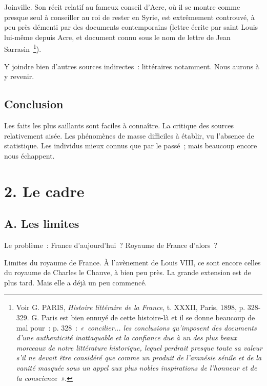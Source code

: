 \documentclass[french,twoside]{book} %
\newcommand\chapteropen{} %
\newcommand\chaptercont{} %
\newcommand\chapterclose{} %
\begin{document}
Joinville. Son récit relatif au fameux conseil d’Acre, où il se montre comme presque seul à conseiller au roi de rester en Syrie, est extrêmement controuvé, à peu près démenti par des documents contemporains (lettre écrite par saint Louis lui-même depuis Acre, et document connu sous le nom de lettre de Jean Sarrasin \footnote{ Voir G. PARIS, {\itshape Histoire littéraire de la France}, t. XXXII, Paris, 1898, p. 328-329. G. Paris est bien ennuyé de cette histoire-là et il se donne beaucoup de mal pour : p. 328 : \emph{« concilier... les conclusions qu’imposent des documents d’une authenticité inattaquable et la confiance due à un des plus beaux morceaux de notre littérature historique, lequel perdrait presque toute sa valeur s’il ne devait être considéré que comme un produit de l’amnésie sénile et de la vanité masquée sous un appel aux plus nobles inspirations de l’honneur et de la conscience »}.}).\par
Y joindre bien d’autres sources indirectes : littéraires notamment. Nous aurons à y revenir.
\section[{Conclusion}]{Conclusion}
\noindent Les faits les plus saillants sont faciles à connaître. La critique des sources relativement aisée. Les phénomènes de masse difficiles à établir, vu l’absence de statistique. Les individus mieux connus que par le passé ; mais beaucoup encore nous échappent.
\chapterclose


\chapteropen
\chapter[{2. Le cadre}]{\textsc{2. }Le cadre}
\label{c02}\renewcommand{\leftmark}{\textsc{2. }Le cadre}


\chaptercont
\section[{A. Les limites}]{A. Les limites}
\label{c02a}
\noindent  {}
\label{p7} Le problème : France d’aujourd’hui ? Royaume de France d’alors ?\par
Limites du royaume de France. À l’avènement de Louis VIII, ce sont encore celles du royaume de Charles le Chauve, à bien peu près. La grande extension est de plus tard. Mais elle a déjà un peu commencé.\par
\end{document}
